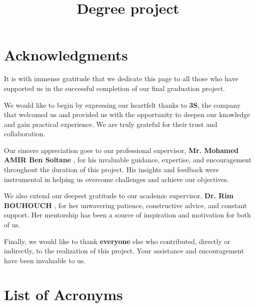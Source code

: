 \documentclass[12pt,english]{report}
\title{Degree project}
\begin{document}


																	


\chapter*{Acknowledgments}
It is with immense gratitude that we dedicate this page to all those who have supported us in the successful completion of our final graduation project.

We would like to begin by expressing our heartfelt thanks to \textbf{3S}, the company that welcomed us and provided us with the opportunity to deepen our knowledge and gain practical experience. We are truly grateful for their trust and collaboration.

Our sincere appreciation goes to our professional supervisor,\textbf{ Mr. Mohamed AMIR Ben Soltane} , for his invaluable guidance, expertise, and encouragement throughout the duration of this project. His insights and feedback were instrumental in helping us overcome challenges and achieve our objectives.

We also extend our deepest gratitude to our academic supervisor, \textbf{Dr. Rim BOUHOUCH} , for her unwavering patience, constructive advice, and constant support. Her mentorship has been a source of inspiration and motivation for both of us.

Finally, we would like to thank \textbf{everyone} else who contributed, directly or indirectly, to the realization of this project. Your assistance and encouragement have been invaluable to us.

\tableofcontents
\newpage
\listoffigures
\newpage
\listoftables
\newpage
\chapter*{List of Acronyms}
\end{document}
